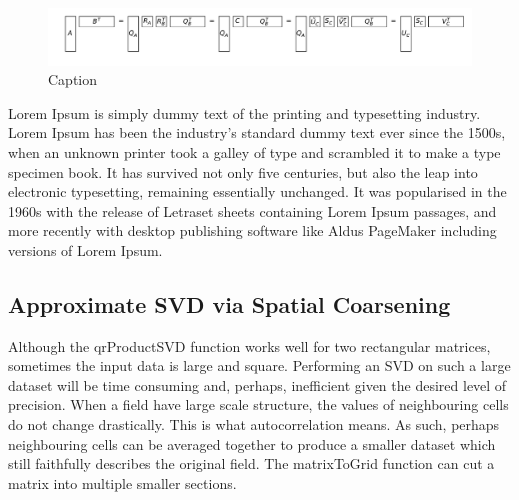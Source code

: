 \documentclass{acm_proc_article-sp}
\begin{document}
\begin{figure}[h]
\begin{center}
\includegraphics[scale=0.25]{Results/qrProductSVD.pdf}
\caption[Small caption]{Caption}
\label{fig:qrProductSVD}
\end{center}
\end{figure}

Lorem Ipsum is simply dummy text of the printing and typesetting industry. Lorem Ipsum has been the industry's standard dummy text ever since the 1500s, when an unknown printer took a galley of type and scrambled it to make a type specimen book. It has survived not only five centuries, but also the leap into electronic typesetting, remaining essentially unchanged. It was popularised in the 1960s with the release of Letraset sheets containing Lorem Ipsum passages, and more recently with desktop publishing software like Aldus PageMaker including versions of Lorem Ipsum.

\subsection{Approximate SVD via Spatial Coarsening}
\label{sec:Techniques Approximate SVD via Spatial Coarsening}

Although the qrProductSVD function works well for two rectangular matrices, sometimes the input data is large and square. Performing an SVD on such a large dataset will be time consuming and, perhaps, inefficient given the desired level of precision. When a field have large scale structure, the values of neighbouring cells do not change drastically. This is what autocorrelation means. As such, perhaps neighbouring cells can be averaged together to produce a smaller dataset which still faithfully describes the original field. The matrixToGrid function can cut a matrix into multiple smaller sections.
\end{document}
